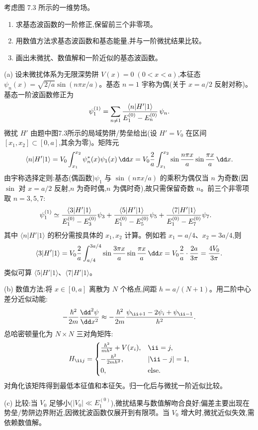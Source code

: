 \begin{question}
考虑图 7.3 所示的一维势场。
\begin{enumerate}
\item 求基态波函数的一阶修正,保留前三个非零项。
\item 用数值方法求基态波函数和基态能量,并与一阶微扰结果比较。
\item 画出未微扰、数值解和一阶近似的基态波函数。
\end{enumerate}
\begin{solution}
(a) 设未微扰体系为无限深势阱 $V(x)=0\;(0<x<a)$,本征态 $\psi_n(x)=\sqrt{2/a}\sin(n\pi x/a)$。基态 $n=1$ 宇称为偶(关于 $x=a/2$ 反射对称)。基态一阶波函数修正为
\[
\psi_1^{(1)}=\sum_{n\ne1}{\langle n|H'|1\rangle\over E_1^{(0)}-E_n^{(0)}}\,\psi_n.
\]
微扰 $H'$ 由题中图7.3所示的局域势阱/势垒给出(设 $H'=V_0$ 在区间 $[x_1,x_2]\subset[0,a]$,其余为零)。矩阵元
\[
\langle n|H'|1\rangle=V_0\int_{x_1}^{x_2}\psi_n^*(x)\psi_1(x)\,\dd x
=V_0{2\over a}\int_{x_1}^{x_2}\sin{n\pi x\over a}\sin{\pi x\over a}\,\dd x.
\]
由宇称选择定则:基态(偶函数)$\psi_1$ 与 $\sin(n\pi x/a)$ 的乘积为偶仅当 $n$ 为奇数(因 $\sin$ 对 $x=a/2$ 反射,$n$ 为奇时偶,$n$ 为偶时奇),故只需保留奇数 $n$。前三个非零项取 $n=3,5,7$:
\[
\begin{aligned}
\psi_1^{(1)}&\simeq
{\langle3|H'|1\rangle\over E_1^{(0)}-E_3^{(0)}}\psi_3
+{\langle5|H'|1\rangle\over E_1^{(0)}-E_5^{(0)}}\psi_5
+{\langle7|H'|1\rangle\over E_1^{(0)}-E_7^{(0)}}\psi_7.
\end{aligned}
\]
其中 $\langle n|H'|1\rangle$ 的积分需按具体的 $x_1,x_2$ 计算。例如若 $x_1=a/4$、$x_2=3a/4$,则
\[
\langle3|H'|1\rangle=V_0{2\over a}\int_{a/4}^{3a/4}\sin{3\pi x\over a}\sin{\pi x\over a}\,\dd x
=V_0{2\over a}\cdot{2a\over3\pi}={4V_0\over3\pi}.
\]
类似可算 $\langle5|H'|1\rangle$、$\langle7|H'|1\rangle$。

(b) 数值方法:将 $x\in[0,a]$ 离散为 $N$ 个格点,间距 $h=a/(N+1)$。用二阶中心差分近似动能:
\[
-{\hbar^2\over2m}{\dd^2\psi\over\dd x^2}
\approx -{\hbar^2\over2m}{\psi_{\ii+1}-2\psi_i+\psi_{\ii-1}\over h^2}.
\]
总哈密顿量化为 $N\times N$ 三对角矩阵:
\[
H_{\ii j}=
\begin{cases}
{\hbar^2\over m h^2}+V(x_i), & \ii=j,\\[2pt]
-{\hbar^2\over2m h^2}, & |\ii-j|=1,\\[2pt]
0, & \text{else}.
\end{cases}
\]
对角化该矩阵得到最低本征值和本征矢。归一化后与微扰一阶近似比较。

(c) 比较:当 $V_0$ 足够小($|V_0|\ll E_1^{(0)}$),微扰结果与数值解吻合良好;偏差主要出现在势垒/势阱边界附近,因微扰波函数仅展开到有限项。当 $V_0$ 增大时,微扰近似失效,需依赖数值解。
\end{solution}
\end{question}


